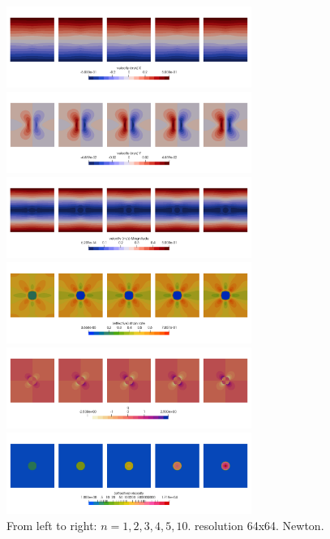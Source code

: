 \begin{center}
\includegraphics[width=8cm]{python_codes/fieldstone_87/results/experiment_05/u.png}
\includegraphics[width=8cm]{python_codes/fieldstone_87/results/experiment_05/v.png}\\
\includegraphics[width=8cm]{python_codes/fieldstone_87/results/experiment_05/vel.png}
\includegraphics[width=8cm]{python_codes/fieldstone_87/results/experiment_05/sr.png}\\
\includegraphics[width=8cm]{python_codes/fieldstone_87/results/experiment_05/press.png}
\includegraphics[width=8cm]{python_codes/fieldstone_87/results/experiment_05/eta.png}\\
{\captionfont From left to right: $n=1,2,3,4,5,10$. resolution 64x64. Newton.}
\end{center}

